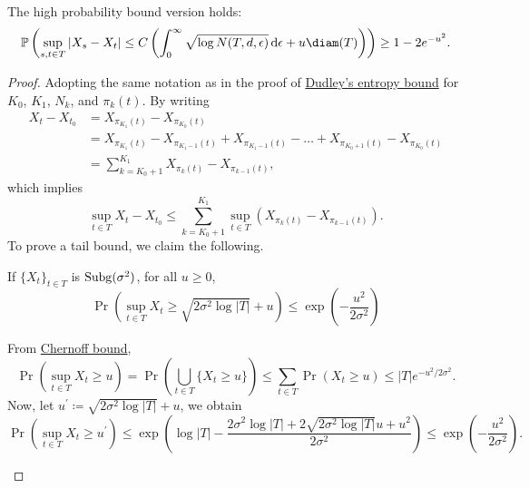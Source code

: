 \begin{corollary}\label{pf-col:Dudley-integral-entropy-bound-hp}
	The high probability bound version holds:
	\[
		\mathbb{P} \left(
		\sup _{s, t\in T} \vert X_s - X_t \vert
		\leq C \left( \int_{0}^{\infty} \sqrt{\log N(T, d, \epsilon )}  \,\mathrm{d}\epsilon + u \diam(T) \right)
		\right) \geq 1 - 2 e^{-u^2}.
	\]
\end{corollary}
\begin{proof}
	Adopting the same notation as in the proof of \hyperref[thm:Dudley-entropy-bound]{Dudley's entropy bound} for \(K_0\), \(K_1\), \(N_k\), and \(\pi _k(t)\). By writing
	\[
		\begin{split}
			X_t - X_{t_0}
			 & = X_{\pi _{K_1} (t)} - X_{\pi _{K_0} (t)}                                                                                   \\
			 & = X_{\pi _{K_1}(t)} - X_{\pi _{K_1 - 1} (t)} + X_{\pi _{K_1 - 1} (t)} - \dots + X_{\pi _{K_0 + 1} (t)} - X_{\pi _{K_0} (t)} \\
			 & = \sum_{k = K_0 + 1}^{K_1} X_{\pi _{k} (t)} - X_{\pi _{k - 1} (t)},
		\end{split}
	\]
	which implies
	\[
		\sup _{t\in T} X_t - X_{t_0}
		\leq \sum_{k = K_0 + 1}^{K_1} \sup _{t\in T} \left( X_{\pi _{k} (t)} - X_{\pi _{k - 1} (t)} \right).
	\]
	To prove a tail bound, we claim the following.

	\begin{claim}
		If \(\{ X_t \} _{t\in T}\) is \(\operatorname{Subg}(\sigma ^2)\), for all \(u \geq 0\),
		\[
			\Pr(\sup _{t\in T} X_t \geq \sqrt{2 \sigma ^2 \log \vert T \vert } + u ) \leq \exp(- \frac{u^2}{2\sigma ^2})
		\]
	\end{claim}
	\begin{explanation}
		From \hyperref[lma:MGF-trick]{Chernoff bound},
		\[
			\Pr(\sup _{t\in T} X_t \geq u)
			= \Pr(\bigcup_{t\in T} \{ X_t \geq u \} )
			\leq \sum_{t\in T} \Pr_{}(X_t \geq u)
			\leq \vert T \vert e^{-u^2 / 2\sigma ^2}.
		\]
		Now, let \(u^{\prime} \coloneqq \sqrt{2 \sigma ^2 \log \vert T \vert } + u \), we obtain
		\[
			\Pr(\sup _{t\in T} X_t \geq u^{\prime} )
			\leq \exp(\log \vert T \vert - \frac{2\sigma ^2 \log \vert T \vert + 2 \sqrt{2\sigma ^2 \log \vert T \vert } u + u^2}{2\sigma ^2})
			\leq \exp(- \frac{u^2}{2\sigma ^2}).
		\]
	\end{explanation}


\end{proof}
